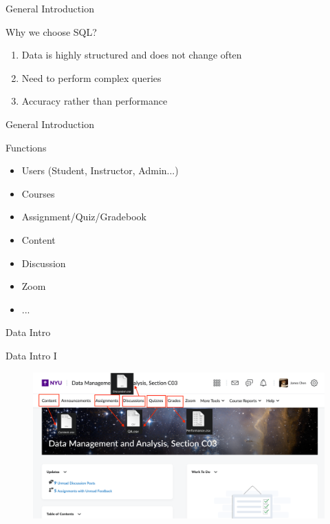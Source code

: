 \documentclass[a4paper,10pt]{beamer}
\begin{document}
\begin{frame}{General Introduction}
\begin{block}{Why we choose SQL?}
\begin{enumerate}
    \item Data is highly structured and does not change often
    \item Need to perform complex queries
    \item Accuracy rather than performance
    
\end{enumerate}
\end{block}
\end{frame}

\begin{frame}{General Introduction}
\begin{block}{Functions}
\begin{itemize}
    \item Users (Student, Instructor, Admin...)
    \item Courses
    \item Assignment/Quiz/Gradebook
    \item Content
    \item Discussion
    \item Zoom
    \item ...
\end{itemize}
\end{block}
\end{frame}

\begin{frame}{Data Intro}
\begin{block}{Data Intro I}
\begin{figure}[H]
    \includegraphics[width=\textwidth]{Intro2.png}
\end{figure}
\end{block}
\end{frame}
\end{document}

